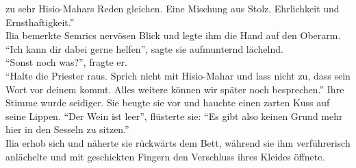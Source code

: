 zu sehr Hisio-Mahars Reden gleichen. Eine Mischung aus Stolz, Ehrlichkeit und Ernsthaftigkeit.''\\
Ilia bemerkte Semrics nervösen Blick und legte ihm die Hand auf den Oberarm. ``Ich kann dir dabei 
gerne helfen'', sagte sie aufmunternd lächelnd.\\
``Sonst noch was?'', fragte er.\\
``Halte die Priester raus. Sprich nicht mit Hisio-Mahar und lass nicht zu, dass sein Wort vor 
deinem kommt. Alles weitere können wir später noch besprechen.'' Ihre Stimme wurde seidiger. Sie 
beugte sie vor und hauchte einen zarten Kuss auf seine Lippen. ``Der Wein ist leer'', flüsterte sie: 
``Es gibt also keinen Grund mehr hier in den Sesseln zu sitzen.''\\
Ilia erhob sich und näherte sie rückwärts dem Bett, während sie ihm verführerisch anlächelte und 
mit geschickten Fingern den Verschluss ihres Kleides öffnete.\\

